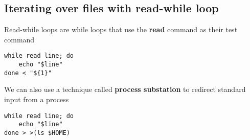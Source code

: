 \documentclass{report}
\begin{document}
    \pagebreak \bigbreak \noindent 
    \subsection{Iterating over files with read-while loop}
    \bigbreak \noindent 
    \begin{concept}
        Read-while loops are while loops that use the \textbf{read} command as their test command
    \end{concept}
    \begin{mdframed}[style=purplebox]
    \begin{verbatim}
while read line; do
    echo "$line"
done < "${1}"
    \end{verbatim}
    \bigbreak \noindent
    \end{mdframed}
    \bigbreak \noindent 
    We can also use a technique called \textbf{process substation} to redirect standard input from a process
    \begin{mdframed}[style=purplebox]
    \begin{verbatim}
while read line; do
    echo "$line"
done > >(ls $HOME)
    \end{verbatim}
    \bigbreak \noindent
    \end{mdframed}
    





  




  




    

    





    
\end{document}
